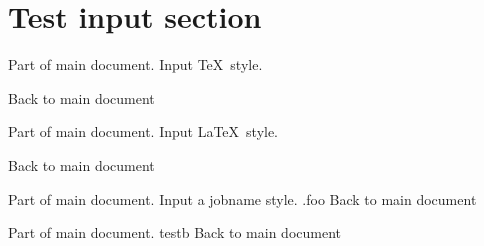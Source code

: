 \documentclass{article}
\begin{document}
\section{Test input section}
Part of main document. Input \TeX\ style.

Back to main document

Part of main document. Input \LaTeX\ style.

Back to main document

Part of main document. Input a jobname style.
 \jobname.foo
Back to main document

\def\testa{Test A.}
\def\testb{Test B.}
\def\testatestb{Test A and B.}
Part of main document. 
 testb
Back to main document
\end{document}

